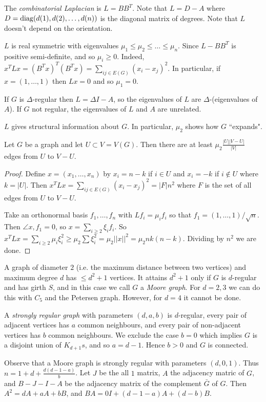 \documentclass[10pt,a4paper]{article}
\begin{document}
The \emph{combinatorial Laplacian} is $L = BB^T$. Note that $L = D-A$ where $D = \operatorname{diag} (d(1),d(2), \ldots, d(n))$ is the diagonal matrix of degrees. Note that $L$ doesn't depend on the orientation.

$L$ is real symmetric with eigenvalues $\mu_1 \leq \mu_2 \leq \ldots \leq \mu_n$. Since $L - BB^T$ is positive semi-definite, and so $\mu_i \geq 0$. Indeed, $x^T Lx = (B^T x)^T(B^T x) = \sum_{ij \in E(G)} (x_i-x_j)^2$. In particular, if $x = (1, \ldots, 1)$ then $Lx = 0$ and so $\mu_1 =0$.

If $G$ is $\Delta$-regular then $L = \Delta I - A$, so the eigenvalues of $L$ are $\Delta$-(eigenvalues of $A$). If $G$ not regular, the eigenvalues of $L$ and $A$ are unrelated.

$L$ gives structural information about $G$. In particular, $\mu_2$ shows how $G$ ``expands".

\begin{theorem}
Let $G$ be a graph and let $U \subset V = V(G)$. Then there are at least $\mu_2 \frac{|U||V-U|}{|V|}$ edges from $U$ to $V-U$.
\end{theorem}
\begin{proof}
Define $x = (x_1, \ldots, x_n)$ by $x_i = n-k$ if $i \in U$ and $x_i = -k$ if $i \notin U$ where $k = |U|$. Then $x^T L x = \sum_{ij \in E(G)} (x_i- x_j)^2 = |F|n^2$ where $F$ is the set of all edges from $U$ to $V-U$.

Take an orthonormal basis $f_1, \ldots, f_n$ with $Lf_i = \mu_i f_i$ so that $f_1 = (1,\ldots, 1)/\sqrt{n}$. Then $\angle{x, f_1} = 0$, so $x = \sum_{i\geq 2} \xi_i f_i$. So $x^T L x = \sum_{i \geq 2} \mu_i \xi_i^2 \geq \mu_2 \sum \xi_i^2 = \mu_2 ||x||^2 = \mu_2 nk(n-k)$. Dividing by $n^2$ we are done.
\end{proof}
A graph of diameter $2$ (i.e. the maximum distance between two vertices) and maximum degree $d$ has $\leq d^2+1$ vertices. It attains $d^2 +1$ only if $G$ is $d$-regular and has girth $S$, and in this case we call $G$ a \emph{Moore graph}. For $d=2,3$ we can do this with $C_5$ and the Petersen graph. However, for $d=4$ it cannot be done.

A \emph{strongly regular graph} with parameters $(d,a,b)$ is $d$-regular, every pair of adjacent vertices has $a$ common neighbours, and every pair of non-adjacent vertices has $b$ common neighbours. We exclude the case $b=0$ which implies $G$ is a disjoint union of $K_{d+1}s$, and so $a = d-1$. Hence $b>0$ and $G$ is connected.

Observe that a Moore graph is strongly regular with parameters $(d,0,1)$. Thus $n = 1+d+\frac{d(d-1-a)}{b}$. Let $J$ be the all $1$ matrix, $A$ the adjacency matric of $G$, and $B-J-I-A$ be the adjacency matrix of the complement $\bar{G}$ of $G$. Then $A^2 = dA + aA + bB$, and $BA = 0I + (d-1-a)A + (d-b)B$.
\end{document}
